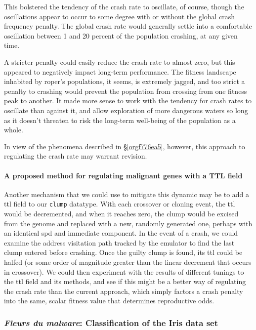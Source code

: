 \documentclass[12pt,glossary]{dalthesis}
\begin{document}
This bolstered the tendency of the crash rate to oscillate, of course, though
the oscillations appear to occur to some degree with or without the global
crash frequency penalty. The global crash rate would generally settle into
a comfortable oscillation between 1 and 20 percent of the population crashing,
at any given time. 

A stricter penalty could easily reduce the crash rate to almost zero, but
this appeared to negatively impact long-term performance. The fitness landscape
inhabited by \gls{roper}'s populations, it seems, is extremely jagged, and
too strict a penalty to crashing would prevent the population from crossing 
from one fitness peak to another. It made more sense to work with the tendency
for crash rates to oscillate than against it, and allow exploration of more
dangerous waters so long as it doesn't threaten to risk the long-term well-being
of the population as a whole. 

In view of the phenomena described in \S \ref{orgf776ea5}, however, this approach to regulating the crash rate may warrant revision. 

\paragraph{A proposed method for regulating malignant genes with a TTL field}
\label{sec:org2a99408}
\label{org4bea782}

Another mechanism that we could use to mitigate this dynamic may be to add
a \gls{ttl} field to our \texttt{clump} datatype. With each crossover or cloning event, 
the \gls{ttl} would be decremented, and when it reaches zero, the clump would be
excised from the genome and replaced with a new, randomly generated one, perhaps
with an identical \gls{spd} and immediate component. In the event of a crash, we
could examine the address visitation path tracked by the emulator to find the 
last clump entered before crashing. Once the guilty clump is found, its \gls{ttl}
could be halfed (or some order of magnitude greater than the linear decrement
that occurs in crossover). We could then experiment with the results of different
tunings to the \gls{ttl} field and its methods, and see if this might be a better
way of regulating the crash rate than the current approach, which simply factors
a crash penalty into the same, scalar fitness value that determines reproductive
odds. 


\subsubsection{\emph{Fleurs du malware}: Classification of the Iris data set}
\label{sec:orge92bdfd}
\label{org35dbd75}
\end{document}
